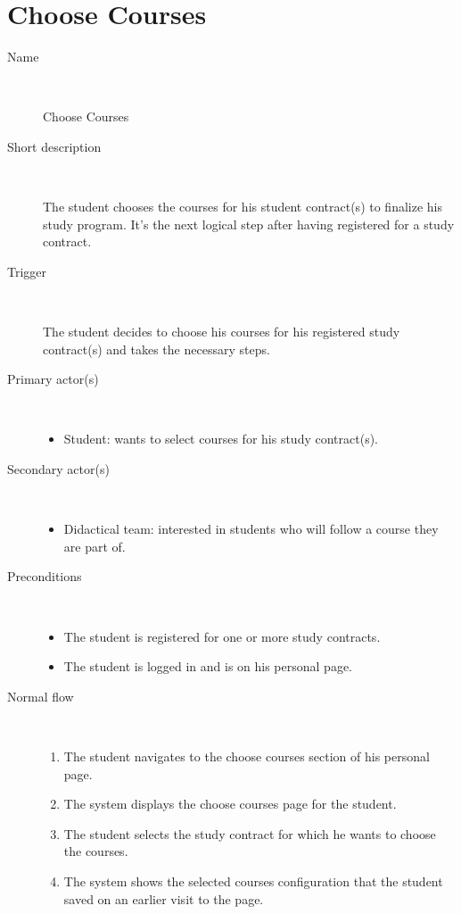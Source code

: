 \section{Choose Courses}

\begin{description}
	\item[Name] \
		\par Choose Courses
	\item[Short description] \ 
			\par The student chooses the courses for his student contract(s) to finalize
			his study program. It's the next logical step after having registered for a
			study contract.
	\item[Trigger] \ 
			\par The student decides to choose his courses for his registered study
			contract(s) and takes the necessary steps.
	\item[Primary actor(s)] \ 
		\begin{itemize}
		  \item Student: wants to select courses for his study contract(s).
		\end{itemize}
	\item[Secondary actor(s)] \ 
		\begin{itemize}
		  \item Didactical team: interested in students who will follow a course they
		  are part of.
		\end{itemize} 
	\item[Preconditions] \ 
	\begin{itemize}
		\item The student is registered for one or more study contracts.
		\item The student is logged in and is on his personal page.
	\end{itemize}
	\item[Normal flow] \ 
	\begin{enumerate}
	  	\item The student navigates to the choose courses section of his personal
	  	page.
	  	\item The system displays the choose courses page for the student.
	  	\item The student selects the study contract for which he wants to choose
	  	the courses.
	  	\item The system shows the selected courses configuration that the student
	  	saved on an earlier visit to the page.

\end{enumerate}
\end{description}
